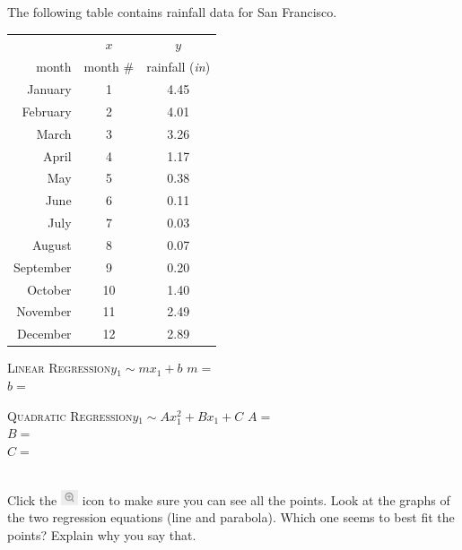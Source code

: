 \documentclass[12pt,letterpaper]{memoir}
\begin{document}
\myWideProblemWithContent 
{
    The following table contains rainfall data 
    for San Francisco.\\[0.5em]
    \begin{minipage}{0.35\textwidth}
        \footnotesize
        \begin{tabular}{rcc}
            &$x$ & $y$ \\ 
            \cmidrule{2-2} \cmidrule{3-3}
            month & month \# & rainfall ({\itshape in}) \\
            \midrule 
            January  &1 & 4.45 \\
            February  &2& 4.01 \\ 
            March  &3& 3.26 \\ 
            April  &4& 1.17 \\ 
            May  &5& 0.38 \\ 
            June  &6& 0.11 \\ 
            July  &7& 0.03 \\ 
            August  &8& 0.07 \\ 
            September  &9& 0.20 \\
            October  &10& 1.40 \\
            November &11& 2.49 \\ 
            December &12& 2.89 \\
            \bottomrule
        \end{tabular}
        \end{minipage}
    \begin{minipage}{0.64\textwidth}
        \begin{tcolorbox}[colback=white,width=\textwidth]
            \small
            \scshape{Linear Regression}\hfill$y_1 \sim m x_1 + b$
            \tcblower
            $m =$  \\
            $b =$ 
        \end{tcolorbox}
        \begin{tcolorbox}[colback=white,width=\textwidth]
            \small
            \scshape{Quadratic Regression}\hfill$y_1 \sim A x_1^2 + B x_1 + C$
            \tcblower
            $A =$  \\
            $B =$ \\
            $C =$ 
        \end{tcolorbox}
    \end{minipage}\\[1\onelineskip]
    Click the 
    \includegraphics[width=0.2in]{magnifying-glass-plus.png} 
    icon to make sure you can see all the points.
    Look at the graphs of the two regression equations 
    (line and parabola).
    Which one seems to best fit the points?
    Explain why you say that.
    \vspace{0.7in}
}
\end{document}
